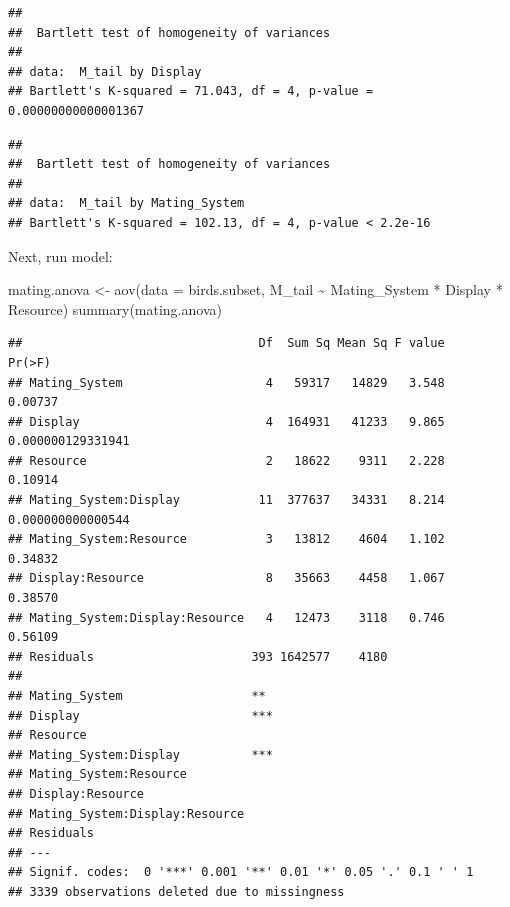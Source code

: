 \documentclass[
  12pt,
]{article}
\newenvironment{Shaded}{\begin{snugshade}}{\end{snugshade}}
\newcommand{\AttributeTok}[1]{\textcolor[rgb]{0.77,0.63,0.00}{#1}}
\newcommand{\FunctionTok}[1]{\textcolor[rgb]{0.00,0.00,0.00}{#1}}
\newcommand{\NormalTok}[1]{#1}
\newcommand{\OtherTok}[1]{\textcolor[rgb]{0.56,0.35,0.01}{#1}}
\newcommand{\SpecialCharTok}[1]{\textcolor[rgb]{0.00,0.00,0.00}{#1}}
\begin{document}
\begin{verbatim}
## 
##  Bartlett test of homogeneity of variances
## 
## data:  M_tail by Display
## Bartlett's K-squared = 71.043, df = 4, p-value = 0.00000000000001367
\end{verbatim}

\begin{verbatim}
## 
##  Bartlett test of homogeneity of variances
## 
## data:  M_tail by Mating_System
## Bartlett's K-squared = 102.13, df = 4, p-value < 2.2e-16
\end{verbatim}

\newpage

Next, run model:

\begin{Shaded}
\begin{Highlighting}[]
\NormalTok{mating.anova }\OtherTok{\textless{}{-}} \FunctionTok{aov}\NormalTok{(}\AttributeTok{data =}\NormalTok{ birds.subset, M\_tail }\SpecialCharTok{\textasciitilde{}}\NormalTok{ Mating\_System }\SpecialCharTok{*}\NormalTok{ Display }\SpecialCharTok{*}\NormalTok{ Resource)}
\FunctionTok{summary}\NormalTok{(mating.anova)}
\end{Highlighting}
\end{Shaded}

\begin{verbatim}
##                                 Df  Sum Sq Mean Sq F value            Pr(>F)
## Mating_System                    4   59317   14829   3.548           0.00737
## Display                          4  164931   41233   9.865 0.000000129331941
## Resource                         2   18622    9311   2.228           0.10914
## Mating_System:Display           11  377637   34331   8.214 0.000000000000544
## Mating_System:Resource           3   13812    4604   1.102           0.34832
## Display:Resource                 8   35663    4458   1.067           0.38570
## Mating_System:Display:Resource   4   12473    3118   0.746           0.56109
## Residuals                      393 1642577    4180                          
##                                   
## Mating_System                  ** 
## Display                        ***
## Resource                          
## Mating_System:Display          ***
## Mating_System:Resource            
## Display:Resource                  
## Mating_System:Display:Resource    
## Residuals                         
## ---
## Signif. codes:  0 '***' 0.001 '**' 0.01 '*' 0.05 '.' 0.1 ' ' 1
## 3339 observations deleted due to missingness
\end{verbatim}
\end{document}
